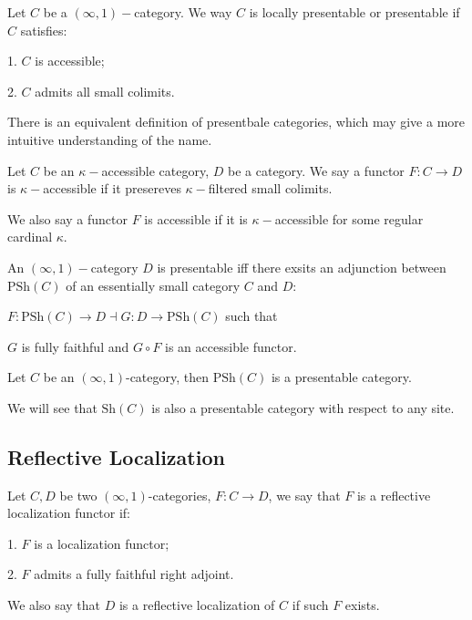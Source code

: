 \begin{definition}
    Let $C$ be a $(\infty,1)-$category. We way $C$ is locally presentable or presentable if $C$ satisfies:

    1. $C$ is accessible;

    2. $C$ admits all small colimits.
\end{definition}

There is an equivalent definition of presentbale categories, which may give a more intuitive understanding of the name.

\begin{definition}
    Let $C$ be an $\kappa-$accessible category, $D$ be a category. We say a functor $F:C\to D$ is $\kappa-$accessible if it presereves $\kappa-$filtered small colimits.

    We also say a functor $F$ is accessible if it is $\kappa-$accessible for some regular cardinal $\kappa$.
\end{definition}

\begin{theorem}
    An $(\infty,1)-$category $D$ is presentable iff there exsits an adjunction between $\text{PSh}(C)$ of an essentially small category $C$ and $D$:

    $F:\text{PSh}(C)\to D \dashv G:D\to\text{PSh}(C)$ such that

    $G$ is fully faithful and $G\circ F$ is an accessible functor.
\end{theorem}

\begin{example}
    Let $C$ be an $(\infty,1)$-category, then $\text{PSh}(C)$ is a presentable category.
\end{example}

We will see that $\text{Sh}(C)$ is also a presentable category with respect to any site.

\subsection{Reflective Localization}


\begin{definition}
    Let $C,D$ be two $(\infty,1)$-categories, $F:C\to D$, we say that $F$ is a reflective localization functor if:

    1. $F$ is a localization functor;

    2. $F$ admits a fully faithful right adjoint.

    We also say that $D$ is a reflective localization of $C$ if such $F$ exists.
\end{definition}

